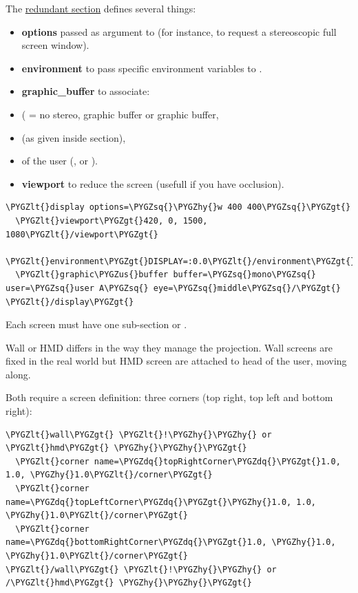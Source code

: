 \documentclass[a4,10pt,openany,oneside]{sphinxmanual}
\def\PYGZus{\char`\_}
\def\PYGZlt{\char`\<}
\def\PYGZgt{\char`\>}
\def\PYGZhy{\char`\-}
\def\PYGZsq{\char`\'}
\def\PYGZdq{\char`\"}
\begin{document}
The  {\hyperref[components/configuration-file:redundant-sections]{redundant section}} defines several things:
\begin{itemize}
\item {} 
\textbf{options} passed as argument to  (for instance,  to request a stereoscopic full screen  window).

\item {} 
\textbf{environment} to pass specific environment variables to .

\item {} 
\textbf{graphic\_buffer} to associate:

\item {} 
 ( = no stereo,  graphic buffer or  graphic buffer,

\item {} 
 (as given inside  section),

\item {} 
 of the user (,  or ).

\item {} 
\textbf{viewport} to reduce the screen (usefull if you have occlusion).

\end{itemize}

\begin{Verbatim}[commandchars=\\\{\}]
\PYGZlt{}display options=\PYGZsq{}\PYGZhy{}w 400 400\PYGZsq{}\PYGZgt{}
  \PYGZlt{}viewport\PYGZgt{}420, 0, 1500, 1080\PYGZlt{}/viewport\PYGZgt{}
  \PYGZlt{}environment\PYGZgt{}DISPLAY=:0.0\PYGZlt{}/environment\PYGZgt{}
  \PYGZlt{}graphic\PYGZus{}buffer buffer=\PYGZsq{}mono\PYGZsq{} user=\PYGZsq{}user A\PYGZsq{} eye=\PYGZsq{}middle\PYGZsq{}/\PYGZgt{}
\PYGZlt{}/display\PYGZgt{}
\end{Verbatim}

Each screen must have one sub-section  or .

Wall or HMD differs in the way they manage the projection. Wall screens are fixed in the real world but HMD screen are attached to head of the user, moving along.

Both require a screen definition: three corners (top right, top left and bottom right):

\begin{Verbatim}[commandchars=\\\{\}]
\PYGZlt{}wall\PYGZgt{} \PYGZlt{}!\PYGZhy{}\PYGZhy{} or \PYGZlt{}hmd\PYGZgt{} \PYGZhy{}\PYGZhy{}\PYGZgt{}
  \PYGZlt{}corner name=\PYGZdq{}topRightCorner\PYGZdq{}\PYGZgt{}1.0, 1.0, \PYGZhy{}1.0\PYGZlt{}/corner\PYGZgt{}
  \PYGZlt{}corner name=\PYGZdq{}topLeftCorner\PYGZdq{}\PYGZgt{}\PYGZhy{}1.0, 1.0, \PYGZhy{}1.0\PYGZlt{}/corner\PYGZgt{}
  \PYGZlt{}corner name=\PYGZdq{}bottomRightCorner\PYGZdq{}\PYGZgt{}1.0, \PYGZhy{}1.0, \PYGZhy{}1.0\PYGZlt{}/corner\PYGZgt{}
\PYGZlt{}/wall\PYGZgt{} \PYGZlt{}!\PYGZhy{}\PYGZhy{} or /\PYGZlt{}hmd\PYGZgt{} \PYGZhy{}\PYGZhy{}\PYGZgt{}
\end{Verbatim}
\end{document}
